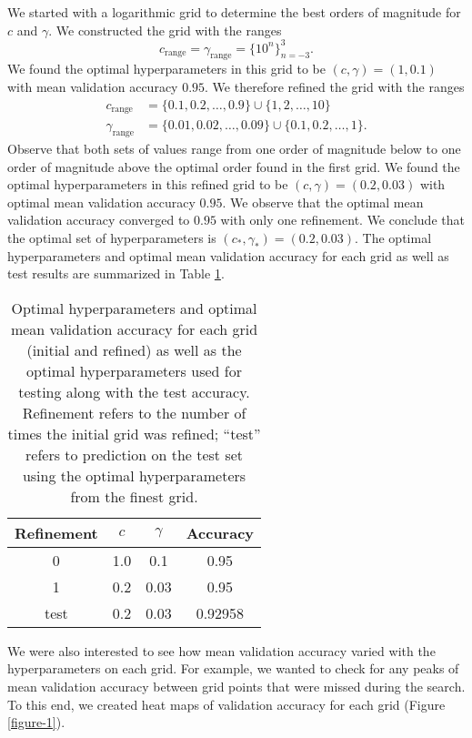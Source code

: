 \documentclass[12pt]{article}
\newcommand{\crange}{c_{\mbox{range}}}
\newcommand{\gamrange}{\gamma_{\mbox{range}}}
\begin{document}
We started with a logarithmic grid to determine the best orders of magnitude for $c$ and $\gamma$. We constructed the grid with the ranges
\[ \crange = \gamrange = \{10^n\}_{n=-3}^3. \]
We found the optimal hyperparameters in this grid to be $(c, \gamma) = (1, 0.1)$ with mean validation accuracy $0.95$. We therefore refined the grid with the ranges
\begin{align*}
\crange &= \{0.1,0.2,\ldots,0.9\} \cup \{1,2,\ldots,10\} \\
\gamrange &= \{0.01,0.02,\ldots,0.09\} \cup \{0.1,0.2,\ldots,1\}.
\end{align*}
Observe that both sets of values range from one order of magnitude below to one order of magnitude above the optimal order found in the first grid. We found the optimal hyperparameters in this refined grid to be $(c, \gamma) = (0.2, 0.03)$ with optimal mean validation accuracy $0.95$. We observe that the optimal mean validation accuracy converged to $0.95$ with only one refinement. We conclude that the optimal set of hyperparameters is $(c_*, \gamma_*) = (0.2, 0.03)$. The optimal hyperparameters and optimal mean validation accuracy for each grid as well as test results are summarized in Table \ref{table-1}.

\begin{table}
\centering
\begin{tabular}{|c|c|c|c|} \hline
Refinement & $c$ & $\gamma$ & Accuracy \\ \hline
0 &  1.0 &  0.1 & 0.95 \\
1 &  0.2 &  0.03 & 0.95 \\
test &  0.2 &  0.03 & 0.92958 \\
\hline
\end{tabular}
\caption{\label{table-1} Optimal hyperparameters and optimal mean validation accuracy for each grid (initial and refined) as well as the optimal hyperparameters used for testing along with the test accuracy. Refinement refers to the number of times the initial grid was refined; ``test'' refers to prediction on the test set using the optimal hyperparameters from the finest grid.}
\end{table}

We were also interested to see how mean validation accuracy varied with the hyperparameters on each grid. For example, we wanted to check for any peaks of mean validation accuracy between grid points that were missed during the search. To this end, we created heat maps of validation accuracy for each grid (Figure \ref{figure-1}).
\end{document}
